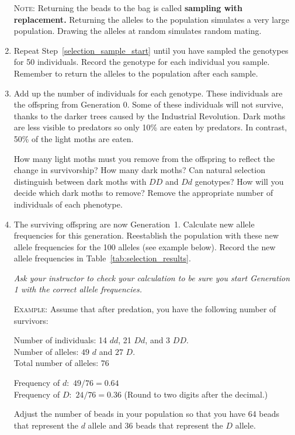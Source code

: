 \documentclass[12pt]{exam}
\newcommand{\allele}[1]{$#1$}
\begin{document}
\begin{questions}
\begin{enumerate}
	\textsc{Note:} Returning the beads to the bag is called \textbf{sampling with replacement.} Returning the alleles to the population simulates a very large population. Drawing the alleles at random simulates random mating.
	
	\item Repeat Step~\ref{selection_sample_start} until you have sampled the genotypes for 50 individuals. Record the genotype for each individual you sample. Remember to return the alleles to the population after each sample. 
	
	\item Add up the number of individuals for each genotype. These individuals are the offspring from Generation 0. Some of these individuals will not survive, thanks to the darker trees caused by the Industrial Revolution. Dark moths are less visible to predators so only 10\% are eaten by predators. In contrast, 50\% of the light moths are eaten. 
	
	How many light moths must you remove from the offspring to reflect the change in survivorship? How many dark moths? Can natural selection distinguish between dark moths with \allele{DD} and \allele{Dd} genotypes? How will you decide which dark moths to remove? Remove the appropriate number of individuals of each phenotype.
	
	\item \label{selection_sample_stop} The surviving offspring are now Generation~1. Calculate new allele frequencies for this generation. Reestablish the population with these new allele frequencies for the 100 alleles (see example below). Record the new allele frequencies in Table~\ref{tab:selection_results}.
	
	\textit{Ask your instructor to check your calculation to be sure you start Generation 1 with the correct allele frequencies.}
	
	\textsc{Example:} Assume that after predation, you have the following number of survivors:
	
	Number of individuals: 14 \allele{dd}, 21 \allele{Dd}, and 3 \allele{DD}.\\
	Number of alleles: $49$ \allele{d} and $27$ \allele{D}.\\
	Total number of alleles: $76$

	Frequency of \allele{d:} $49/76 = 0.64$\\
	Frequency of \allele{D:} $24/76 = 0.36$ (Round to two digits after the decimal.)

	Adjust the number of beads in your population so that you have 64 beads that represent the \allele{d} allele and 36 beads that represent the \allele{D} allele.  
	

\end{enumerate}
\end{questions}
\end{document}
